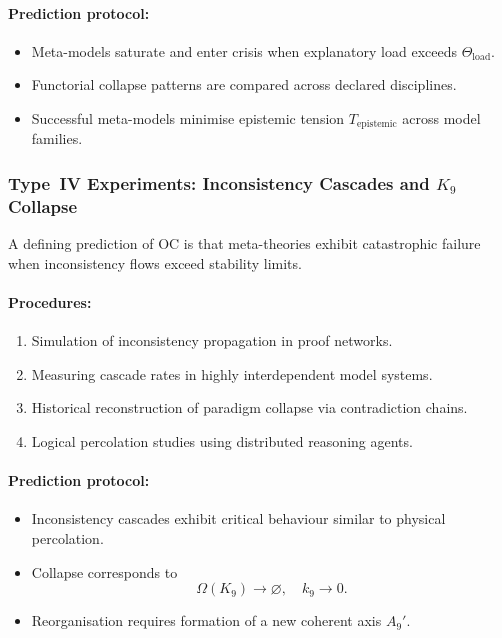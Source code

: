 \paragraph{Prediction protocol:}

\begin{itemize}
    \item Meta-models saturate and enter crisis when
          explanatory load exceeds $\Theta_{\mathrm{load}}$.
    \item Functorial collapse patterns are compared across declared disciplines.
    \item Successful meta-models minimise epistemic tension
          $T_{\mathrm{epistemic}}$ across model families.
\end{itemize}



\subsubsection{Type~IV Experiments: Inconsistency Cascades and \texorpdfstring{$K_9$}{K_9} Collapse}

A defining prediction of OC is that meta-theories exhibit
catastrophic failure when inconsistency flows exceed stability limits.

\paragraph{Procedures:}

\begin{enumerate}
    \item Simulation of inconsistency propagation in proof networks.
    \item Measuring cascade rates in highly interdependent model systems.
    \item Historical reconstruction of paradigm collapse via contradiction chains.
    \item Logical percolation studies using distributed reasoning agents.
\end{enumerate}

\paragraph{Prediction protocol:}

\begin{itemize}
    \item Inconsistency cascades exhibit critical behaviour
          similar to physical percolation.
    \item Collapse corresponds to
          \[
              \Omega(K_9) \to \varnothing,\quad k_9 \to 0.
          \]
    \item Reorganisation requires formation of a new coherent axis $A_9'$.
\end{itemize}




